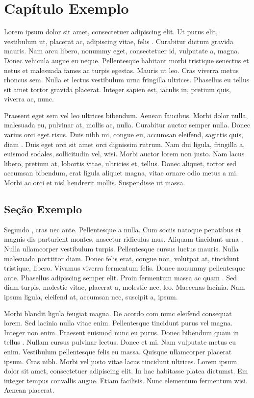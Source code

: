 
\chapter{Capítulo Exemplo}
\noindent
Lorem ipsum dolor sit amet, consectetuer adipiscing elit. Ut purus elit, vestibulum ut, placerat ac, adipiscing vitae, felis \citep{Salles2014}. Curabitur dictum gravida mauris. Nam arcu libero, nonummy eget, consectetuer id, vulputate a, magna. Donec vehicula augue eu neque. Pellentesque habitant morbi tristique senectus et netus et malesuada fames ac turpis egestas. Mauris ut leo. Cras viverra metus rhoncus sem. Nulla et lectus vestibulum urna fringilla ultrices. Phasellus eu tellus sit amet tortor gravida placerat. Integer sapien est, iaculis in, pretium quis, viverra ac, nunc.

Praesent eget sem vel leo ultrices bibendum. Aenean faucibus. Morbi dolor nulla, malesuada eu, pulvinar at, mollis ac, nulla. Curabitur auctor semper nulla. Donec varius orci eget risus. Duis nibh mi, congue eu, accumsan eleifend, sagittis quis, diam \citep{Justel2014}. Duis eget orci sit amet orci dignissim rutrum. Nam dui ligula, fringilla a, euismod sodales, sollicitudin vel, wisi. Morbi auctor lorem non justo. Nam lacus libero, pretium at, lobortis vitae, ultricies et, tellus. Donec aliquet, tortor sed accumsan bibendum, erat ligula aliquet magna, vitae ornare odio metus a mi. Morbi ac orci et nisl hendrerit mollis. Suspendisse ut massa.

\section{Seção Exemplo}
Segundo \citet{Goldschmidt2005}, cras nec ante. Pellentesque a nulla. Cum sociis natoque penatibus et magnis dis parturient montes, nascetur ridiculus mus. Aliquam tincidunt urna \citep{Rakocevic2014}. Nulla ullamcorper vestibulum turpis. Pellentesque cursus luctus mauris. Nulla malesuada porttitor diam. Donec felis erat, congue non, volutpat at, tincidunt tristique, libero. Vivamus viverra fermentum felis. Donec nonummy pellentesque ante. Phasellus adipiscing semper elit. Proin fermentum massa ac quam \citep{Lara2014}. Sed diam turpis, molestie vitae, placerat a, molestie nec, leo. Maecenas lacinia. Nam ipsum ligula, eleifend at, accumsan nec, suscipit a, ipsum.

Morbi blandit ligula feugiat magna. De acordo com  \citet{Soares2013} nunc eleifend consequat lorem. Sed lacinia nulla vitae enim. Pellentesque tincidunt purus vel magna. Integer non enim. Praesent euismod nunc eu purus. Donec bibendum quam in tellus \citep{Yoko2003}. Nullam cursus pulvinar lectus. Donec et mi. Nam vulputate metus eu enim. Vestibulum pellentesque felis eu massa. Quisque ullamcorper placerat ipsum. Cras nibh. Morbi vel justo vitae lacus tincidunt ultrices. Lorem ipsum dolor sit amet, consectetuer adipiscing elit. In hac habitasse platea dictumst. Em \citet{Dias2013} integer tempus convallis augue. Etiam facilisis. Nunc elementum fermentum wisi. Aenean placerat.

